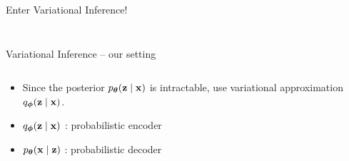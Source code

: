 \documentclass{beamer}
\begin{document}
\begin{frame}{Enter Variational Inference!}
\begin{columns}[T]
\begin{column}{.3\textwidth}
\begin{figure}
            \end{figure}
        \end{column}
    \end{columns}
\end{frame}

\begin{frame}{Variational Inference -- our setting}
    \begin{columns}[T]
        \begin{column}{.7\textwidth}
            \begin{itemize}
                \item Since the posterior $p_{\boldsymbol{\theta}}(\mathbf{z} \mid \mathbf{x})$ is intractable, use variational approximation $q_{\boldsymbol{\phi}}(\mathbf{z} \mid \mathbf{x})$.
                \item $q_{\boldsymbol{\phi}}(\mathbf{z} \mid \mathbf{x})$ : probabilistic {\color{red} encoder}
                \item $p_{\boldsymbol{\theta}}(\mathbf{x} \mid \mathbf{z})$ : probabilistic {\color{blue} decoder}
            \end{itemize}
        \end{column}
        \begin{column}{.3\textwidth}
        \end{column}
    \end{columns}
\end{frame}


\end{document}
